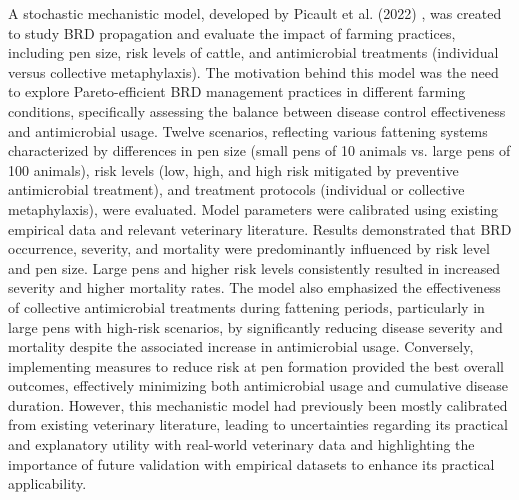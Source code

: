 
A stochastic mechanistic model, developed by Picault et al. (2022) \cite{picault_modelling_2022}, was created to study BRD propagation and evaluate the impact of farming practices, including pen size, risk levels of cattle, and antimicrobial treatments (individual versus collective metaphylaxis). The motivation behind this model was the need to explore Pareto-efficient BRD management practices in different farming conditions, specifically assessing the balance between disease control effectiveness and antimicrobial usage. Twelve scenarios, reflecting various fattening systems characterized by differences in pen size (small pens of 10 animals vs. large pens of 100 animals), risk levels (low, high, and high risk mitigated by preventive antimicrobial treatment), and treatment protocols (individual or collective metaphylaxis), were evaluated. Model parameters were calibrated using existing empirical data and relevant veterinary literature. Results demonstrated that BRD occurrence, severity, and mortality were predominantly influenced by risk level and pen size. Large pens and higher risk levels consistently resulted in increased severity and higher mortality rates. The model also emphasized the effectiveness of collective antimicrobial treatments during fattening periods, particularly in large pens with high-risk scenarios, by significantly reducing disease severity and mortality despite the associated increase in antimicrobial usage. Conversely, implementing measures to reduce risk at pen formation provided the best overall outcomes, effectively minimizing both antimicrobial usage and cumulative disease duration. However, this mechanistic model had previously been mostly calibrated from existing veterinary literature, leading to uncertainties regarding its practical and explanatory utility with real-world veterinary data and highlighting the importance of future validation with empirical datasets to enhance its practical applicability.

